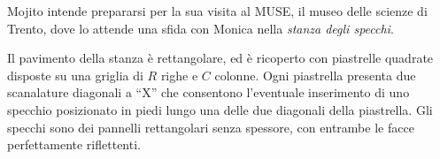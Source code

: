 \usepackage{xcolor}
\usepackage{afterpage}
\usepackage{pifont,mdframed}
\usepackage[bottom]{footmisc}
\usepackage{caption}



\renewcommand{\inputfile}{\texttt{stdin}}
\renewcommand{\outputfile}{\texttt{stdout}}
\makeatletter
\renewcommand{\this@inputfilename}{\texttt{stdin}}
\renewcommand{\this@outputfilename}{\texttt{stdout}}
\makeatother

\newenvironment{warning}
  {\par\begin{mdframed}[linewidth=2pt,linecolor=gray]%
    \begin{list}{}{\leftmargin=1cm
                   \labelwidth=\leftmargin}\item[\Large\ding{43}]}
  {\end{list}\end{mdframed}\par}


\newenvironment{todoenv}
  {\par\begin{mdframed}[linewidth=2pt,linecolor=red]%
	\begin{list}{}{\leftmargin=1cm
		           \labelwidth=\leftmargin}\item[\Large\ding{169}]}
  {\end{list}\end{mdframed}\par}

\newcommand{\todo}[1]{\begin{todoenv}
	TODO: #1
\end{todoenv}}


Mojito intende prepararsi per la sua visita al MUSE, il museo delle scienze di Trento,
dove lo attende una sfida con Monica nella \emph{stanza degli specchi}.

Il pavimento della stanza è rettangolare,
ed è ricoperto con piastrelle quadrate
disposte su una griglia di $R$ righe e $C$ colonne.
Ogni piastrella presenta due scanalature diagonali a ``X'' che consentono l'eventuale inserimento di uno specchio posizionato in piedi lungo una delle due diagonali della piastrella. Gli specchi sono dei pannelli rettangolari senza spessore, con entrambe le facce perfettamente riflettenti.

